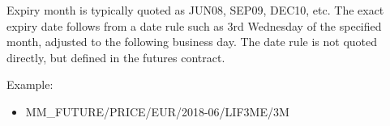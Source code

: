 Expiry month is typically quoted as JUN08, SEP09, DEC10, etc. The exact expiry date follows from a date rule such as 3rd
Wednesday of the specified month, adjusted to the following business day. The date rule is not quoted directly, but
defined in the futures contract.

\medskip
Example:
\begin{itemize}
\item {MM\_FUTURE/PRICE/EUR/2018-06/LIF3ME/3M}
\end{itemize}

%
%
%

